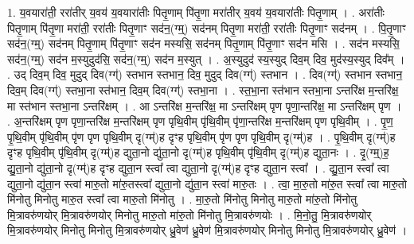 \documentclass[17pt]{extarticle}
\begin{document}
1. य॒वयारा॑ती॒ ररा॑तीर् य॒वय॑ य॒वयारा॑तीः पितृ॒णाम् पि॑तृ॒णा मरा॑तीर् य॒वय॑ य॒वयारा॑तीः पितृ॒णाम् । . अरा॑तीः पितृ॒णाम् पि॑तृ॒णा मरा॑ती॒ ररा॑तीः पितृ॒णाꣳ सद॑न॒(ग्म्॒) सद॑नम् पितृ॒णा मरा॑ती॒ ररा॑तीः पितृ॒णाꣳ सद॑नम् । . पि॒तृ॒णाꣳ सद॑न॒(ग्म्॒) सद॑नम् पितृ॒णाम् पि॑तृ॒णाꣳ सद॑न मस्यसि॒ सद॑नम् पितृ॒णाम् पि॑तृ॒णाꣳ सद॑न मसि । . सद॑न मस्यसि॒ सद॑न॒(ग्म्॒) सद॑न म॒स्युदुद॑सि॒ सद॑न॒(ग्म्॒) सद॑न म॒स्युत् । . अ॒स्युदुद॑ स्य॒स्युद् दिव॒म् दिव॒ मुद॑स्य॒स्युद् दिव᳚म् । . उद् दिव॒म् दिव॒ मुदुद् दिव(ग्ग्॑) स्तभान स्तभान॒ दिव॒ मुदुद् दिव(ग्ग्॑) स्तभान । . दिव(ग्ग्॑) स्तभान स्तभान॒ दिव॒म् दिव(ग्ग्॑) स्तभा॒ना स्त॑भान॒ दिव॒म् दिव(ग्ग्॑) स्तभा॒ना । . स्त॒भा॒ना स्त॑भान स्तभा॒ना ऽन्तरि॑क्ष म॒न्तरि॑क्ष॒ मा स्त॑भान स्तभा॒ना ऽन्तरि॑क्षम् । . आ ऽन्तरि॑क्ष म॒न्तरि॑क्ष॒ मा ऽन्तरि॑क्षम् पृण पृणा॒न्तरि॑क्ष॒ मा ऽन्तरि॑क्षम् पृण । . अ॒न्तरि॑क्षम् पृण पृणा॒न्तरि॑क्ष म॒न्तरि॑क्षम् पृण पृथि॒वीम् पृ॑थि॒वीम् पृ॑णा॒न्तरि॑क्ष म॒न्तरि॑क्षम् पृण पृथि॒वीम् । . पृ॒ण॒ पृ॒थि॒वीम् पृ॑थि॒वीम् पृ॑ण पृण पृथि॒वीम् दृ(ग्म्॑)ह दृꣳह पृथि॒वीम् पृ॑ण पृण पृथि॒वीम् दृ(ग्म्॑)ह । . पृ॒थि॒वीम् दृ(ग्म्॑)ह दृꣳह पृथि॒वीम् पृ॑थि॒वीम् दृ(ग्म्॑)ह द्युता॒नो द्यु॑ता॒नो दृ(ग्म्॑)ह पृथि॒वीम् पृ॑थि॒वीम् दृ(ग्म्॑)ह द्युता॒नः । . दृ॒(ग्म्॒)ह॒ द्यु॒ता॒नो द्यु॑ता॒नो दृ(ग्म्॑)ह दृꣳह द्युता॒न स्त्वा᳚ त्वा द्युता॒नो दृ(ग्म्॑)ह दृꣳह द्युता॒न स्त्वा᳚ । . द्यु॒ता॒न स्त्वा᳚ त्वा द्युता॒नो द्यु॑ता॒न स्त्वा॑ मारु॒तो मा॑रु॒तस्त्वा᳚ द्युता॒नो द्यु॑ता॒न स्त्वा॑ मारु॒तः । . त्वा॒ मा॒रु॒तो मा॑रु॒त स्त्वा᳚ त्वा मारु॒तो मि॑नोतु मिनोतु मारु॒त स्त्वा᳚ त्वा मारु॒तो मि॑नोतु । . मा॒रु॒तो मि॑नोतु मिनोतु मारु॒तो मा॑रु॒तो मि॑नोतु मि॒त्रावरु॑णयोर् मि॒त्रावरु॑णयोर् मिनोतु मारु॒तो मा॑रु॒तो मि॑नोतु मि॒त्रावरु॑णयोः । . मि॒नो॒तु॒ मि॒त्रावरु॑णयोर् मि॒त्रावरु॑णयोर् मिनोतु मिनोतु मि॒त्रावरु॑णयोर् ध्रु॒वेण॑ ध्रु॒वेण॑ मि॒त्रावरु॑णयोर् मिनोतु मिनोतु मि॒त्रावरु॑णयोर् ध्रु॒वेण॑ । \newline
\end{document}
